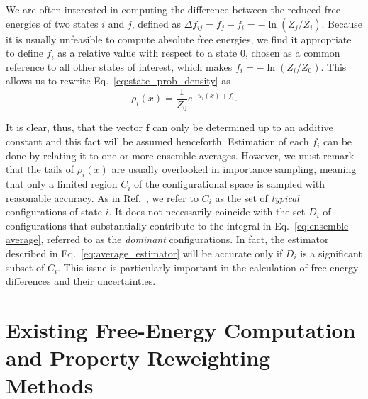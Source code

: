 \documentclass[aip,jcp,preprint,amsmath,amssymb]{revtex4-1}
\newcommand{\vt}[1]{\boldsymbol{\mathbf{#1}}}           %
\begin{document}
We are often interested in computing the difference between the reduced free energies of two states $i$ and $j$, defined as $\Delta f_{ij} = f_j - f_i = - \ln (Z_j/Z_i)$. Because it is usually unfeasible to compute absolute free energies, we find it appropriate to define $f_i$ as a relative value with respect to a state $0$, chosen as a common reference to all other states of interest, which makes $f_i = -\ln (Z_i/Z_0)$. This allows us to rewrite Eq.~\eqref{eq:state_prob_density} as
\begin{equation}
\label{eq:state_prob_density_Z0}
\rho_i(x) = \frac{1}{Z_0} e^{-u_i(x)+ f_i}.
\end{equation}

It is clear, thus, that the vector $\vt f$ can only be determined up to an additive constant and this fact will be assumed henceforth. Estimation of each $f_i$ can be done by relating it to one or more ensemble averages. However, we must remark that the tails of $\rho_i(x)$ are usually overlooked in importance sampling, meaning that only a limited region $C_i$ of the configurational space is sampled with reasonable accuracy. As in Ref.~, we refer to $C_i$ as the set of \textit{typical} configurations of state $i$. It does not necessarily coincide with the set $D_i$ of configurations that substantially contribute to the integral in Eq.~\eqref{eq:ensemble average}, referred to as the \textit{dominant} configurations. In fact, the estimator described in Eq.~\eqref{eq:average_estimator} will be accurate only if $D_i$ is a significant subset of $C_i$. This issue is particularly important in the calculation of free-energy differences and their uncertainties.

\section{Existing Free-Energy Computation and Property Reweighting Methods}
\end{document}
